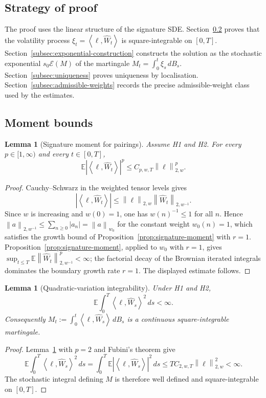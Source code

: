 \documentclass[11pt,oneside]{article}
\theoremstyle{plain}
\newtheorem{lemma}[theorem]{Lemma}
\theoremstyle{definition}
\theoremstyle{remark}
\newcommand{\E}{\mathbb{E}}
\newcommand{\cW}{\widehat W}
\newcommand{\norm}[1]{\left\lVert #1\right\rVert}
\newcommand{\abs}[1]{\left\lvert #1\right\rvert}
\newcommand{\inner}[2]{\left\langle #1,#2\right\rangle}
\begin{document}
\subsection{Strategy of proof}

The proof uses the linear structure of the signature SDE. Section~\ref{subsec:moment-bounds} proves that the volatility process $\xi_t=\inner{\ell}{\cW_t}$ is square-integrable on $[0,T]$. Section~\ref{subsec:exponential-construction} constructs the solution as the stochastic exponential $s_0\mathcal E(M)$ of the martingale $M_t=\int_0^t\xi_s\,dB_s$. Section~\ref{subsec:uniqueness} proves uniqueness by localisation. Section~\ref{subsec:admissible-weights} records the precise admissible-weight class used by the estimates.

\subsection{Moment bounds}\label{subsec:moment-bounds}

\begin{lemma}[Signature moment for pairings]\label{lem:pairing-moment}
Assume H1 and H2. For every $p\in[1,\infty)$ and every $t\in[0,T]$,
\[
\E\abs{\inner{\ell}{\cW_t}}^p\leq C_{p,w,T}\norm{\ell}_{2,w}^p.
\]
\end{lemma}

\begin{proof}
Cauchy--Schwarz in the weighted tensor levels gives
\[
\abs{\inner{\ell}{\cW_t}}\leq \norm{\ell}_{2,w}\norm{\cW_t}_{2,w^{-1}}.
\]
Since $w$ is increasing and $w(0)=1$, one has $w(n)^{-1}\leq1$ for all $n$. Hence $\norm{a}_{2,w^{-1}}\leq \sum_{n\geq0}\abs{a_n}=\norm{a}_{w_0}$ for the constant weight $w_0(n)=1$, which satisfies the growth bound of Proposition~\ref{prop:signature-moment} with $r=1$. Proposition~\ref{prop:signature-moment}, applied to $w_0$ with $r=1$, gives $\sup_{t\leq T}\E\norm{\cW_t}_{2,w^{-1}}^p<\infty$; the factorial decay of the Brownian iterated integrals dominates the boundary growth rate $r=1$. The displayed estimate follows.
\end{proof}

\begin{lemma}[Quadratic-variation integrability]\label{lem:qv-integrability}
Under H1 and H2,
\[
\E\int_0^T \inner{\ell}{\cW_s}^2\,ds <\infty.
\]
Consequently $M_t:=\int_0^t\inner{\ell}{\cW_s}\,dB_s$ is a continuous square-integrable martingale.
\end{lemma}

\begin{proof}
Lemma~\ref{lem:pairing-moment} with $p=2$ and Fubini's theorem give
\[
\E\int_0^T \inner{\ell}{\cW_s}^2\,ds
=\int_0^T \E\abs{\inner{\ell}{\cW_s}}^2\,ds
\leq T C_{2,w,T}\norm{\ell}_{2,w}^2<\infty.
\]
The stochastic integral defining $M$ is therefore well defined and square-integrable on $[0,T]$.
\end{proof}
\end{document}
